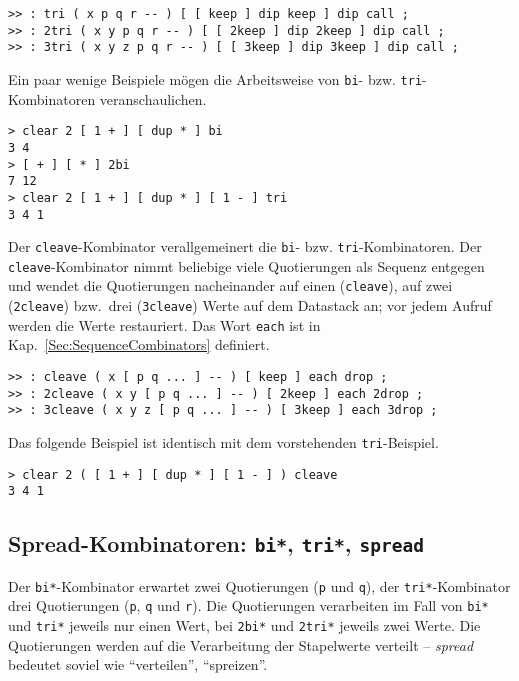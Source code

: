 \begin{verbatim}
>> : tri ( x p q r -- ) [ [ keep ] dip keep ] dip call ;
>> : 2tri ( x y p q r -- ) [ [ 2keep ] dip 2keep ] dip call ;
>> : 3tri ( x y z p q r -- ) [ [ 3keep ] dip 3keep ] dip call ;
\end{verbatim}

Ein paar wenige Beispiele mögen die Arbeitsweise von \verb|bi|- bzw. \verb|tri|-Kombinatoren veranschaulichen.

\begin{verbatim}
> clear 2 [ 1 + ] [ dup * ] bi
3 4
> [ + ] [ * ] 2bi
7 12
> clear 2 [ 1 + ] [ dup * ] [ 1 - ] tri
3 4 1
\end{verbatim}

Der \verb|cleave|-Kombinator verallgemeinert die \verb|bi|- bzw. \verb|tri|-Kombinatoren. Der \verb|cleave|-Kombinator nimmt beliebige viele Quotierungen als Sequenz entgegen und wendet die Quotierungen nacheinander auf einen (\verb|cleave|), auf zwei (\verb|2cleave|) bzw.\ drei (\verb|3cleave|) Werte auf dem Datastack an; vor jedem Aufruf werden die Werte restauriert. Das Wort \verb|each| ist in Kap.~\ref{Sec:SequenceCombinators} definiert.

\begin{verbatim}
>> : cleave ( x [ p q ... ] -- ) [ keep ] each drop ;
>> : 2cleave ( x y [ p q ... ] -- ) [ 2keep ] each 2drop ;
>> : 3cleave ( x y z [ p q ... ] -- ) [ 3keep ] each 3drop ;
\end{verbatim}

Das folgende Beispiel ist identisch mit dem vorstehenden \verb|tri|-Beispiel.

\begin{verbatim}
> clear 2 ( [ 1 + ] [ dup * ] [ 1 - ] ) cleave
3 4 1
\end{verbatim}

\subsection{Spread-Kombinatoren: \texttt{bi*}, \texttt{tri*}, \texttt{spread}}

Der \verb|bi*|-Kombinator erwartet zwei Quotierungen (\verb|p| und \verb|q|), der \verb|tri*|-Kombinator drei Quotierungen (\verb|p|, \verb|q| und \verb|r|). Die Quotierungen verarbeiten im Fall von \verb|bi*| und \verb|tri*| jeweils nur einen Wert, bei \verb|2bi*| und \verb|2tri*| jeweils zwei Werte. Die Quotierungen werden auf die Verarbeitung der Stapelwerte verteilt -- \emph{spread} bedeutet soviel wie "`verteilen"', "`spreizen"'.

